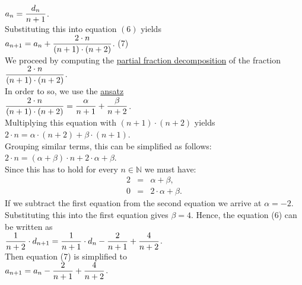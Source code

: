 \hspace*{1.3cm}
$\displaystyle a_n = \frac{d_n}{n+1}$. 
\\[0.2cm] 
Substituting this into equation $(6)$ yields
\\[0.2cm]
\hspace*{1.3cm}
$\displaystyle a_{n+1} = a_{n} + \frac{2\cdot n}{(n+1)\cdot(n+2)}$.  \hspace*{\fill} (7)
\\[0.2cm]
We proceed by computing the 
\href{http://en.wikipedia.org/wiki/Partial_fraction}{partial fraction decomposition}
of the fraction
\\[0.2cm]
\hspace*{1.3cm}
$\displaystyle\frac{2\cdot n}{(n+1)\cdot(n+2)}$.
\\[0.2cm] 
In order to so, we use the \href{http://en.wikipedia.org/wiki/Ansatz}{ansatz}
\\[0.2cm]
\hspace*{1.3cm}
$\displaystyle\frac{2\cdot n}{(n+1)\cdot(n+2)} = \frac{\alpha}{n+1} + \frac{\beta}{n+2}$.
\\[0.2cm] 
Multiplying this equation with $(n+1) \cdot (n+2)$ yields
\\[0.2cm]
\hspace*{1.3cm}
$ 2\cdot n = \alpha \cdot (n+2) + \beta \cdot (n+1)$.
\\[0.2cm]
Grouping similar terms, this can be simplified as follows:
\\[0.2cm]
\hspace*{1.3cm}
$2\cdot n = (\alpha + \beta) \cdot n + 2 \cdot \alpha  + \beta$.
\\[0.2cm]
Since this has to hold for every $n \in \mathbb{N}$ we must have:
\begin{eqnarray*}
  2 & = & \alpha + \beta, \\
  0 & = & 2 \cdot \alpha + \beta.
\end{eqnarray*}
If we subtract the first equation from the second equation we arrive at
 $\alpha = -2$.  Substituting this into the first equation gives $\beta = 4$.
Hence, the equation (6) can be written as
\\[0.2cm]
\hspace*{1.3cm}
$\displaystyle\frac{1}{n+2} \cdot d_{n+1} = \frac{1}{n+1}\cdot d_{n} - \frac{2}{n+1} + \frac{4}{n+2}$.  
\\[0.2cm]  
Then equation (7) is simplified to
\\[0.2cm]
\hspace*{1.3cm}
$\displaystyle a_{n+1} = a_{n} - \frac{2}{n+1} + \frac{4}{n+2}$.
\\[0.2cm] 
